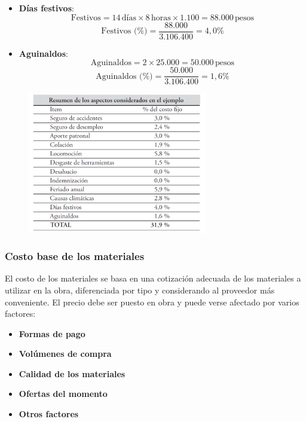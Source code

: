 \begin{itemize}
\begin{itemize}
        \item \textbf{Días festivos}:
        \begin{equation}
        \text{Festivos} = 14 \, \text{días} \times 8 \, \text{horas} \times 1.100 = 88.000 \, \text{pesos}
        \end{equation}
        \begin{equation}
        \text{Festivos (\%)} = \frac{88.000}{3.106.400} = 4,0\%
        \end{equation}
        
        \item \textbf{Aguinaldos}:
        \begin{equation}
        \text{Aguinaldos} = 2 \times 25.000 = 50.000 \, \text{pesos}
        \end{equation}
        \begin{equation}
        \text{Aguinaldos (\%)} = \frac{50.000}{3.106.400} = 1,6\%
        \end{equation}
    \end{itemize}
\end{itemize}

\begin{figure}[H]
    \centering
    \includegraphics[width=0.7\textwidth]{FOTOS/indem.png}
    \label{fig:costo_mo}
\end{figure}

\subsubsection{Costo base de los materiales}

El costo de los materiales se basa en una cotización adecuada de los materiales a utilizar en la obra, diferenciada por tipo y considerando al proveedor más conveniente. El precio debe ser puesto en obra y puede verse afectado por varios factores:
\begin{itemize}
    \item \textbf{Formas de pago}
    \item \textbf{Volúmenes de compra}
    \item \textbf{Calidad de los materiales}
    \item \textbf{Ofertas del momento}
    \item \textbf{Otros factores}
\end{itemize}

